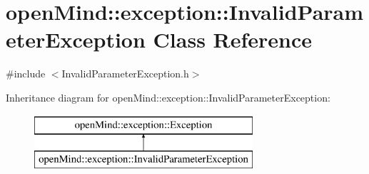 \hypertarget{classopen_mind_1_1exception_1_1_invalid_parameter_exception}{\section{open\+Mind\+:\+:exception\+:\+:Invalid\+Parameter\+Exception Class Reference}
\label{classopen_mind_1_1exception_1_1_invalid_parameter_exception}
}


{\ttfamily \#include $<$Invalid\+Parameter\+Exception.\+h$>$}

Inheritance diagram for open\+Mind\+:\+:exception\+:\+:Invalid\+Parameter\+Exception\+:\begin{figure}[H]
\begin{center}
\leavevmode
\includegraphics[height=2.000000cm]{classopen_mind_1_1exception_1_1_invalid_parameter_exception}
\end{center}
\end{figure}
